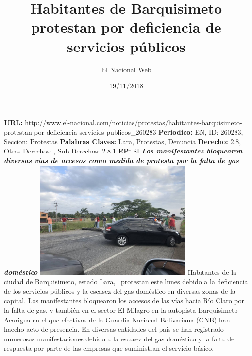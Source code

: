 \documentclass{article}%
\title{\textbf{Habitantes de Barquisimeto protestan por deficiencia de servicios públicos}}%
\author{El Nacional Web}%
\date{19/11/2018}%
\begin{document}
%
\normalsize%
\maketitle%
\textbf{URL: }%
http://www.el{-}nacional.com/noticias/protestas/habitantes{-}barquisimeto{-}protestan{-}por{-}deficiencia{-}servicios{-}publicos\_260283\newline%
%
\textbf{Periodico: }%
EN, %
ID: %
260283, %
Seccion: %
Protestas\newline%
%
\textbf{Palabras Claves: }%
Lara, Protestas, Denuncia\newline%
%
\textbf{Derecho: }%
2.8, %
Otros Derechos: %
, %
Sub Derechos: %
2.8.1\newline%
%
\textbf{EP: }%
SI\newline%
\newline%
%
\textbf{\textit{Los manifestantes bloquearon diversas vías de accesos como medida de protesta por la falta de gas doméstico}}%
\newline%
\newline%
%
\includegraphics[width=300px]{174.jpg}%
\newline%
%
Habitantes de la ciudad de Barquisimeto, estado Lara,~ protestan este lunes debido a la deficiencia de los servicios públicos y la escasez del gas doméstico en diversas zonas de la capital.%
\newline%
%
Los manifestantes bloquearon los accesos de las vías hacia Río Claro por la falta de gas, y también en el sector El Milagro en la autopista Barquisimeto {-} Acarigua en el que efectivos de la Guardia Nacional Bolivariana (GNB) han haecho acto de presencia.%
\newline%
%
En diversas entidades del país se han registrado numerosas manifestaciones debido a la escasez del gas doméstico y la falta de respuesta por parte de las empresas que suministran el servicio básico.%
\newline%
%
\end{document}
